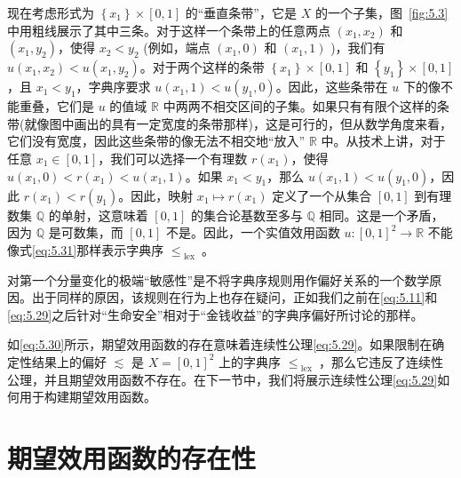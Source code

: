 现在考虑形式为 \(\left\{  {x}_{1}\right\}   \times  \left\lbrack  {0,1}\right\rbrack\) 的“垂直条带”，它是 \(X\) 的一个子集，图~\ref{fig:5.3}中用粗线展示了其中三条。对于这样一个条带上的任意两点 \(\left( {{x}_{1},{x}_{2}}\right)\) 和 \(\left( {{x}_{1},{y}_{2}}\right)\)，使得 \({x}_{2} < {y}_{2}\) (例如，端点 \(\left( {{x}_{1},0}\right)\) 和 \(\left( {{x}_{1},1}\right)\) )，我们有 \(u\left( {{x}_{1},{x}_{2}}\right)  < u\left( {{x}_{1},{y}_{2}}\right)\)。对于两个这样的条带 \(\left\{  {x}_{1}\right\}   \times  \left\lbrack  {0,1}\right\rbrack\) 和 \(\left\{  {y}_{1}\right\}   \times  \left\lbrack  {0,1}\right\rbrack\)，且 \({x}_{1} < {y}_{1}\)，字典序要求 \(u\left( {{x}_{1},1}\right)  < u\left( {{y}_{1},0}\right)\)。因此，这些条带在 \(u\) 下的像不能重叠，它们是 \(u\) 的值域 \(\mathbb{R}\) 中两两不相交区间的子集。如果只有有限个这样的条带(就像图中画出的具有一定宽度的条带那样)，这是可行的，但从数学角度来看，它们没有宽度，因此这些条带的像无法不相交地“放入” \(\mathbb{R}\) 中。从技术上讲，对于任意 \({x}_{1} \in  \left\lbrack  {0,1}\right\rbrack\)，我们可以选择一个有理数 \(r\left( {x}_{1}\right)\)，使得 \(u\left( {{x}_{1},0}\right)  < r\left( {x}_{1}\right)  < u\left( {{x}_{1},1}\right)\)。如果 \({x}_{1} < {y}_{1}\)，那么 \(u\left( {{x}_{1},1}\right)  < u\left( {{y}_{1},0}\right)\)，因此 \(r\left( {x}_{1}\right)  < r\left( {y}_{1}\right)\)。因此，映射 \({x}_{1} \mapsto  r\left( {x}_{1}\right)\) 定义了一个从集合 \(\left\lbrack  {0,1}\right\rbrack\) 到有理数集 \(\mathbb{Q}\) 的单射，这意味着 \(\left\lbrack  {0,1}\right\rbrack\) 的集合论基数至多与 \(\mathbb{Q}\) 相同。这是一个矛盾，因为 \(\mathbb{Q}\) 是可数集，而 \(\left\lbrack  {0,1}\right\rbrack\) 不是。因此，一个实值效用函数 \(u : {\left\lbrack  0,1\right\rbrack  }^{2} \rightarrow  \mathbb{R}\) 不能像式\eqref{eq:5.31}那样表示字典序 \({ \leq  }_{\text{ lex }}\)。

对第一个分量变化的极端“敏感性”是不将字典序规则用作偏好关系的一个数学原因。出于同样的原因，该规则在行为上也存在疑问，正如我们之前在\eqref{eq:5.11}和\eqref{eq:5.29}之后针对“生命安全”相对于“金钱收益”的字典序偏好所讨论的那样。

如\eqref{eq:5.30}所示，期望效用函数的存在意味着连续性公理\eqref{eq:5.29}。如果限制在确定性结果上的偏好 \(\lesssim\) 是 \(X = {\left\lbrack  0,1\right\rbrack  }^{2}\) 上的字典序 \({ \leq  }_{\text{ lex }}\)，那么它违反了连续性公理，并且期望效用函数不存在。在下一节中，我们将展示连续性公理\eqref{eq:5.29}如何用于构建期望效用函数。

\section{期望效用函数的存在性}\label{sec:5.8}

